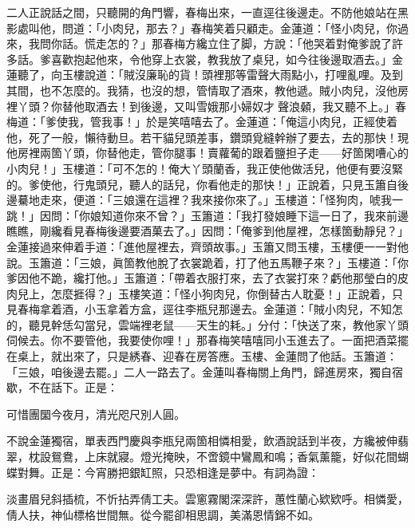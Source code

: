 二人正說話之間，只聽開的角門響，春梅出來，一直逕往後邊走。不防他娘站在黑影處叫他，問道：「小肉兒，那去？」春梅笑着只顧走。{}金蓮道：「怪小肉兒，你過來，我問你話。慌走怎的？」那春梅方纔立住了脚，方說：「他哭着對俺爹說了許多話。爹喜歡抱起他來，令他穿上衣裳，教我放了桌兒，如今往後邊取酒去。」金蓮聽了，向玉樓說道：「賊沒廉恥的貨！頭裡那等雷聲大雨點小，打哩亂哩。及到其間，也不怎麼的。我猜，也沒的想，管情取了酒來，教他遞。{}賊小肉兒，沒他房裡丫頭？你替他取酒去！到後邊，又叫雪娥那小婦奴才𣭈聲浪顙，{}我又聽不上。」春梅道：「爹使我，管我事！」於是笑嘻嘻去了。金蓮道：「俺這小肉兒，正經使着他，死了一般，懶待動旦。{}若干貓兒頭差事，鑽頭覓縫幹辦了要去，去的那快！現他房裡兩箇丫頭，你替他走，管你腿事！賣蘿葡的跟着鹽担子走——好箇閑嘈心的小肉兒！」玉樓道：「可不怎的！俺大丫頭蘭香，我正使他做活兒，他便有要沒緊的。爹使他，行鬼頭兒，聽人的話兒，你看他走的那快！」正說着，只見玉簫自後邊驀地走來，便道：「三娘還在這裡？我來接你來了。」玉樓道：「怪狗肉，唬我一跳！」{}因問：「你娘知道你來不曾？」玉簫道：「我打發娘睡下這一日了，我來前邊瞧瞧，剛纔看見春梅後邊要酒菓去了。」因問：「俺爹到他屋裡，怎樣箇動靜兒？」金蓮接過來伸着手道：「進他屋裡去，齊頭故事。」{}玉簫又問玉樓，玉樓便一一對他說。玉簫道：「三娘，眞箇教他脫了衣裳跪着，打了他五馬鞭子來？」玉樓道：「你爹因他不跪，纔打他。」玉簫道：「帶着衣服打來，去了衣裳打來？虧他那瑩白的皮肉兒上，怎麼捱得？」{}玉樓笑道：「怪小狗肉兒，你倒替古人耽憂！」正說着，只見春梅拿着酒，小玉拿着方盒，逕往李瓶兒那邊去。金蓮道：「賊小肉兒，不知怎的，聽見幹恁勾當兒，雲端裡老鼠——天生的耗。」分付：「快送了來，教他家丫頭伺候去。你不要管他，我要使你哩！」那春梅笑嘻嘻同小玉進去了。一面把酒菜擺在桌上，就出來了，只是綉春、迎春在房答應。玉樓、金蓮問了他話。玉簫道：「三娘，咱後邊去罷。」二人一路去了。金蓮叫春梅關上角門，歸進房來，獨自宿歇，不在話下。正是：

\begin{myquote} 
可惜團圞今夜月，清光咫尺別人圓。
\end{myquote} 

不說金蓮獨宿，單表西門慶與李瓶兒兩箇相憐相愛，飲酒說話到半夜，方纔被伸翡翠，枕設鴛鴦，上床就寢。燈光掩映，不啻鏡中鸞鳳和鳴；香氣薰籠，好似花間蝴蝶對舞。正是：今宵勝把銀缸照，只恐相逢是夢中。有詞為證：

\begin{myquote} 
淡畫眉兒斜插梳，不忻拈弄倩工夫。雲窻霧閣深深許，蕙性蘭心欵欵呼。相憐愛，倩人扶，神仙標格世間無。從今罷卻相思調，美滿恩情錦不如。
\end{myquote} 

